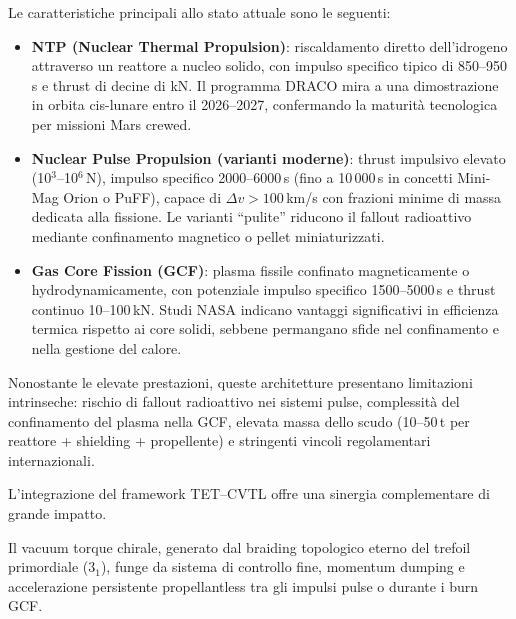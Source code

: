 \documentclass[11pt,a4paper]{article}
\theoremstyle{plain}
\theoremstyle{definition}
\begin{document}
Le caratteristiche principali allo stato attuale sono le seguenti:
\begin{itemize}

\vspace{0.1cm}
    \item \textbf{NTP (Nuclear Thermal Propulsion)}: riscaldamento diretto dell'idrogeno attraverso un reattore a nucleo solido, con impulso specifico tipico di 850--950\,s e thrust di decine di kN. Il programma DRACO mira a una dimostrazione in orbita cis-lunare entro il 2026--2027, confermando la maturità tecnologica per missioni Mars crewed.


    \vspace{0.1cm}
    \item \textbf{Nuclear Pulse Propulsion (varianti moderne)}: thrust impulsivo elevato (10$^3$--10$^6$\,N), impulso specifico 2000--6000\,s (fino a 10\,000\,s in concetti Mini-Mag Orion o PuFF), capace di $\Delta v > 100$\,km/s con frazioni minime di massa dedicata alla fissione. Le varianti “pulite” riducono il fallout radioattivo mediante confinamento magnetico o pellet miniaturizzati.

    \vspace{0.1cm}
    \item \textbf{Gas Core Fission (GCF)}: plasma fissile confinato magneticamente o hydrodynamicamente, con potenziale impulso specifico 1500--5000\,s e thrust continuo 10--100\,kN. Studi NASA indicano vantaggi significativi in efficienza termica rispetto ai core solidi, sebbene permangano sfide nel confinamento e nella gestione del calore.
\end{itemize}

\vspace{0.2cm}


Nonostante le elevate prestazioni, queste architetture presentano limitazioni intrinseche: rischio di fallout radioattivo nei sistemi pulse, complessità del confinamento del plasma nella GCF, elevata massa dello scudo (10--50\,t per reattore + shielding + propellente) e stringenti vincoli regolamentari internazionali.

\vspace{0.2cm}

L’integrazione del framework TET--CVTL offre una sinergia complementare di grande impatto. 

\vspace{0.2cm}

Il vacuum torque chirale, generato dal braiding topologico eterno del trefoil primordiale ($3_1$), funge da sistema di controllo fine, momentum dumping e accelerazione persistente propellantless tra gli impulsi pulse o durante i burn GCF. 
\end{document}
